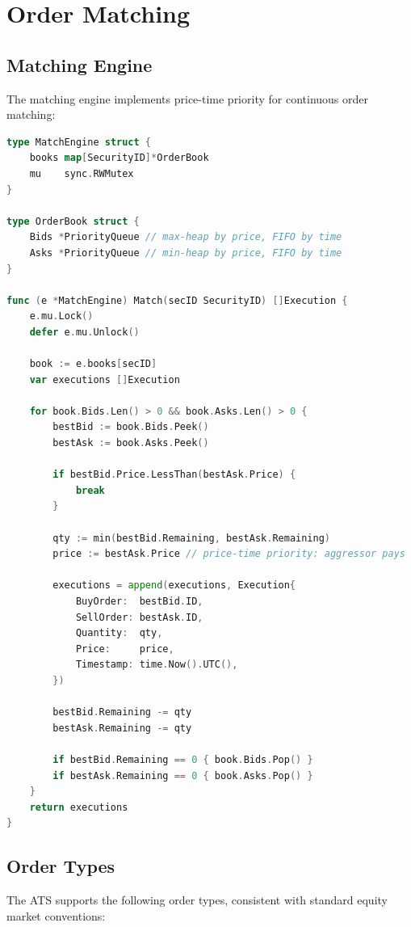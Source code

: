 \section{Order Matching}
\label{sec:matching}

\subsection{Matching Engine}

The matching engine implements price-time priority for continuous order matching:

\begin{lstlisting}[language=Go,caption={Matching engine core.}]
type MatchEngine struct {
    books map[SecurityID]*OrderBook
    mu    sync.RWMutex
}

type OrderBook struct {
    Bids *PriorityQueue // max-heap by price, FIFO by time
    Asks *PriorityQueue // min-heap by price, FIFO by time
}

func (e *MatchEngine) Match(secID SecurityID) []Execution {
    e.mu.Lock()
    defer e.mu.Unlock()

    book := e.books[secID]
    var executions []Execution

    for book.Bids.Len() > 0 && book.Asks.Len() > 0 {
        bestBid := book.Bids.Peek()
        bestAsk := book.Asks.Peek()

        if bestBid.Price.LessThan(bestAsk.Price) {
            break
        }

        qty := min(bestBid.Remaining, bestAsk.Remaining)
        price := bestAsk.Price // price-time priority: aggressor pays

        executions = append(executions, Execution{
            BuyOrder:  bestBid.ID,
            SellOrder: bestAsk.ID,
            Quantity:  qty,
            Price:     price,
            Timestamp: time.Now().UTC(),
        })

        bestBid.Remaining -= qty
        bestAsk.Remaining -= qty

        if bestBid.Remaining == 0 { book.Bids.Pop() }
        if bestAsk.Remaining == 0 { book.Asks.Pop() }
    }
    return executions
}
\end{lstlisting}

\subsection{Order Types}

The ATS supports the following order types, consistent with standard equity market conventions:

